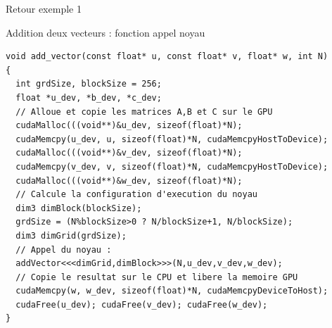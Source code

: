 \documentclass[handout,francais]{beamer}
\begin{document}
\begin{frame}[fragile]{Retour exemple 1}

\begin{block}{Addition deux vecteurs : fonction appel noyau}
 \begin{lstlisting}
void add_vector(const float* u, const float* v, float* w, int N) 
{
  int grdSize, blockSize = 256;
  float *u_dev, *b_dev, *c_dev;
  // Alloue et copie les matrices A,B et C sur le GPU
  cudaMalloc(((void**)&u_dev, sizeof(float)*N);
  cudaMemcpy(u_dev, u, sizeof(float)*N, cudaMemcpyHostToDevice);  
  cudaMalloc(((void**)&v_dev, sizeof(float)*N);
  cudaMemcpy(v_dev, v, sizeof(float)*N, cudaMemcpyHostToDevice);  
  cudaMalloc(((void**)&w_dev, sizeof(float)*N);
  // Calcule la configuration d'execution du noyau
  dim3 dimBlock(blockSize);
  grdSize = (N%blockSize>0 ? N/blockSize+1, N/blockSize);
  dim3 dimGrid(grdSize);
  // Appel du noyau :
  addVector<<<dimGrid,dimBlock>>>(N,u_dev,v_dev,w_dev);  
  // Copie le resultat sur le CPU et libere la memoire GPU
  cudaMemcpy(w, w_dev, sizeof(float)*N, cudaMemcpyDeviceToHost);
  cudaFree(u_dev); cudaFree(v_dev); cudaFree(w_dev);  
}
\end{lstlisting}
\end{block}
\end{frame}
\end{document}
